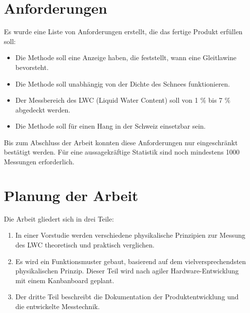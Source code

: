 \section{Anforderungen}

Es wurde eine Liste von Anforderungen erstellt, die das fertige Produkt erfüllen soll:
\begin{itemize}
    \item Die Methode soll eine Anzeige haben, die feststellt, wann eine Gleitlawine bevorsteht.
    \item Die Methode soll unabhängig von der Dichte des Schnees funktionieren.
    \item Der Messbereich des LWC (Liquid Water Content) soll von 1 \% bis 7 \% abgedeckt werden.
    \item Die Methode soll für einen Hang in der Schweiz einsetzbar sein.
\end{itemize}

Bis zum Abschluss der Arbeit konnten diese Anforderungen nur eingeschränkt bestätigt werden. Für eine aussagekräftige Statistik sind noch mindestens 1000 Messungen erforderlich.

\section{Planung der Arbeit}

Die Arbeit gliedert sich in drei Teile:
\begin{enumerate}
    \item In einer Vorstudie werden verschiedene physikalische Prinzipien zur Messung des LWC theoretisch und praktisch verglichen.
    \item Es wird ein Funktionsmuster gebaut, basierend auf dem vielversprechendsten physikalischen Prinzip. Dieser Teil wird nach agiler Hardware-Entwicklung mit einem Kanbanboard geplant.
    \item Der dritte Teil beschreibt die Dokumentation der Produktentwicklung und die entwickelte Messtechnik.
\end{enumerate}
\fi
